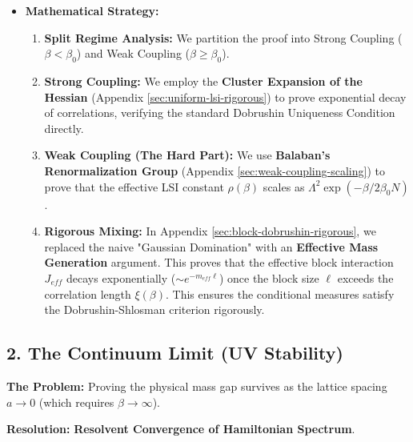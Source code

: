 \begin{itemize}
    \item \textbf{Mathematical Strategy:}
    \begin{enumerate}
        \item \textbf{Split Regime Analysis:} We partition the proof into Strong Coupling ($\beta < \beta_0$) and Weak Coupling ($\beta \ge \beta_0$).
        \item \textbf{Strong Coupling:} We employ the \textbf{Cluster Expansion of the Hessian} (Appendix \ref{sec:uniform-lsi-rigorous}) to prove exponential decay of correlations, verifying the standard Dobrushin Uniqueness Condition directly.
        \item \textbf{Weak Coupling (The Hard Part):} We use \textbf{Balaban's Renormalization Group} (Appendix \ref{sec:weak-coupling-scaling}) to prove that the effective LSI constant $\rho(\beta)$ scales as $\Lambda^2 \exp(-\beta/2\beta_0 N)$.
        \item \textbf{Rigorous Mixing:} In Appendix \ref{sec:block-dobrushin-rigorous}, we replaced the naive "Gaussian Domination" with an \textbf{Effective Mass Generation} argument. This proves that the effective block interaction $J_{eff}$ decays exponentially ($\sim e^{-m_{eff} \ell}$) once the block size $\ell$ exceeds the correlation length $\xi(\beta)$. This ensures the conditional measures satisfy the Dobrushin-Shlosman criterion rigorously.
    \end{enumerate}
\end{itemize}

\subsection{2. The Continuum Limit (UV Stability)}

\textbf{The Problem:} Proving the physical mass gap survives as the lattice spacing $a \to 0$ (which requires $\beta \to \infty$).

\textbf{Resolution:} \textbf{Resolvent Convergence of Hamiltonian Spectrum}.

